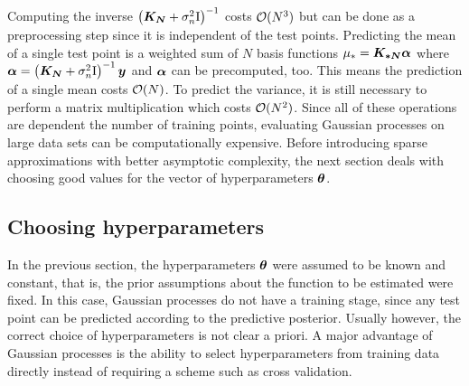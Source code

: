 Computing the inverse $\left(\bm{K_N} + \sigma_n^2 \mathrm{I} \right)^{-1}$ costs $\operatorname{\mathcal{O}}(N^3)$ but can be done as a preprocessing step since it is independent of the test points.
Predicting the mean of a single test point is a weighted sum of $N$ basis functions $\mu_\ast = \bm{K_{\ast N}} \bm{\alpha}$ where $\bm{\alpha} = \left(\bm{K_N} + \sigma_n^2 \mathrm{I} \right)^{-1} \bm{y}$ and $\bm{\alpha}$ can be precomputed, too.
This means the prediction of a single mean costs $\operatorname{\mathcal{O}}(N)$.
To predict the variance, it is still necessary to perform a matrix multiplication which costs $\operatorname{\mathcal{O}}(N^2)$.
Since all of these operations are dependent the number of training points, evaluating Gaussian processes on large data sets can be computationally expensive.
Before introducing sparse approximations with better asymptotic complexity, the next section deals with choosing good values for the vector of hyperparameters $\bm{\theta}$.

\subsection{Choosing hyperparameters}
\label{sub:gp_hyperparameters}
In the previous section, the hyperparameters $\bm{\theta}$ were assumed to be known and constant, that is, the prior assumptions about the function to be estimated were fixed.
In this case, Gaussian processes do not have a training stage, since any test point can be predicted according to the predictive posterior.
Usually however, the correct choice of hyperparameters is not clear a priori.
A major advantage of Gaussian processes is the ability to select hyperparameters from training data directly instead of requiring a scheme such as cross validation.

